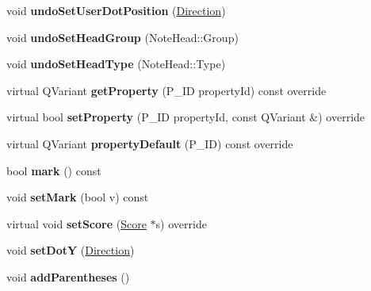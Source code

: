 \begin{DoxyCompactItemize}
void {\bfseries undo\+Set\+User\+Dot\+Position} (\hyperlink{class_ms_1_1_direction}{Direction})
\item 
\mbox{\label{class_ms_1_1_note_a3fec71c17bb93f0bc623f16f24c50f20}} 
void {\bfseries undo\+Set\+Head\+Group} (Note\+Head\+::\+Group)
\item 
\mbox{\label{class_ms_1_1_note_a49460d8225bd6d9370f0db35536f405c}} 
void {\bfseries undo\+Set\+Head\+Type} (Note\+Head\+::\+Type)
\item 
\mbox{\label{class_ms_1_1_note_abeb65c9013feef8c0fa9c5fe9e6f840f}} 
virtual Q\+Variant {\bfseries get\+Property} (P\+\_\+\+ID property\+Id) const override
\item 
\mbox{\label{class_ms_1_1_note_a03365f8ae76c2a09db71f7fc410ed118}} 
virtual bool {\bfseries set\+Property} (P\+\_\+\+ID property\+Id, const Q\+Variant \&) override
\item 
\mbox{\label{class_ms_1_1_note_aa00f4e2aafb9a49fa77bc442fbca9c1b}} 
virtual Q\+Variant {\bfseries property\+Default} (P\+\_\+\+ID) const override
\item 
\mbox{\label{class_ms_1_1_note_af4d2a7dbde350f65fb2c4722e45f3c65}} 
bool {\bfseries mark} () const
\item 
\mbox{\label{class_ms_1_1_note_a828f3bc7dec6aa94dbb302d4fd5f94b0}} 
void {\bfseries set\+Mark} (bool v) const
\item 
\mbox{\label{class_ms_1_1_note_a2e8e367c5cd6bc24fd8e81ba7fc0db04}} 
virtual void {\bfseries set\+Score} (\hyperlink{class_ms_1_1_score}{Score} $\ast$s) override
\item 
\mbox{\label{class_ms_1_1_note_aad21335a2a9a90b9d623bbf3d55f747a}} 
void {\bfseries set\+DotY} (\hyperlink{class_ms_1_1_direction}{Direction})
\item 
\mbox{\label{class_ms_1_1_note_a7f20131afc3681704bdb4d74217a27a6}} 
void {\bfseries add\+Parentheses} ()
\item 

\end{DoxyCompactItemize}
